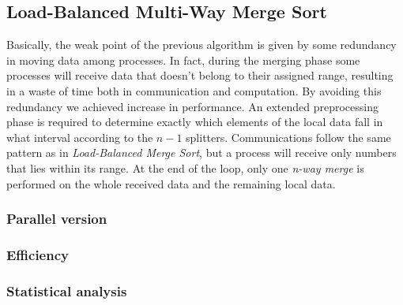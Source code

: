 \subsection{Load-Balanced Multi-Way Merge Sort}
Basically, the weak point of the previous algorithm is given by some redundancy in moving data among processes. In fact, during the merging phase some processes will receive data that doesn't belong to their assigned range, resulting in a waste of time both in communication and computation. By avoiding this redundancy we achieved increase in performance. An extended preprocessing phase is required to determine exactly which elements of the local data fall in what interval according to the $n-1$ splitters. Communications follow the same pattern as in \textit{Load-Balanced Merge Sort}, but a process will receive only numbers that lies within its range. At the end of the loop, only one \textit{n-way merge} is performed on the whole received data and the remaining local data.



\subsubsection*{Parallel version}
\subsubsection*{Efficiency} 
\subsubsection*{Statistical analysis}

